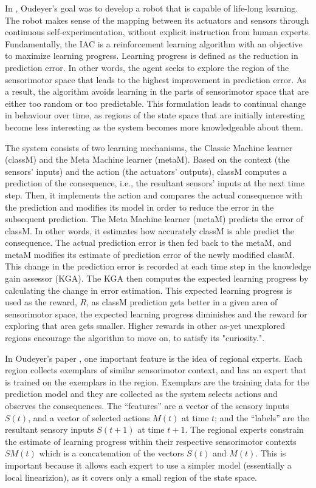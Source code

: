 In \cite{Oudeyer2007}, Oudeyer's goal was to develop a robot that is capable of life-long learning. The robot makes sense of the mapping between its actuators and sensors through continuous self-experimentation, without explicit instruction from human experts. Fundamentally, the IAC is a reinforcement learning algorithm with an objective to maximize learning progress. Learning progress is defined as the reduction in prediction error. In other words, the agent seeks to explore the region of the sensorimotor space that leads to the highest improvement in prediction error. As a result, the algorithm avoids learning in the parts of sensorimotor space that are either too random or too predictable. This formulation leads to continual change in behaviour over time, as regions of the state space that are initially interesting become less interesting as the system becomes more knowledgeable about them. 

The system consists of two learning mechanisms, the Classic Machine learner (classM) and the Meta Machine learner (metaM).  Based on the context (the sensors' inputs) and the action (the actuators' outputs), classM computes a prediction of the consequence, i.e., the resultant sensors' inputs at the next time step. Then, it implements the action and compares the actual consequence with the prediction and modifies its model in order to reduce the error in the subsequent prediction. The Meta Machine learner (metaM) predicts the error of classM. In other words, it estimates how accurately classM is able predict the consequence. The actual prediction error is then fed back to the metaM, and metaM modifies its estimate of prediction error of the newly modified classM. This change in the prediction error is recorded at each time step in the knowledge gain assessor (KGA). The KGA then computes the expected learning progress by calculating the change in error estimation. This expected learning progress is used as the reward, $R$, as classM prediction gets better in a given area of sensorimotor space, the expected learning progress diminishes and the reward for exploring that area gets smaller. Higher rewards in other as-yet unexplored regions encourage the algorithm to move on, to satisfy its "curiosity.". 

In Oudeyer's paper \cite{Oudeyer2007}, one important feature is the idea of regional experts. Each region collects exemplars of similar sensorimotor context, and has an expert that is trained on the exemplars in the region. Exemplars are the training data for the prediction model and they are collected as the system selects actions and observes the consequences. The ``features'' are a vector of the sensory inputs $S(t)$, and a vector of selected actions $M(t)$ at time $t$; and the ``labels'' are the resultant sensory inputs $S(t+1)$ at time $t+1$. The regional experts constrain the estimate of learning progress within their respective sensorimotor contexts $SM(t)$ which is a concatenation of the vectors $S(t)$ and $M(t)$. This is important because it allows each expert to use a simpler model (essentially a local linearizion), as it covers only a small region of the state space.  


